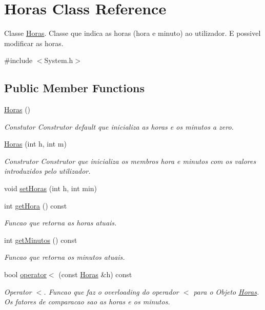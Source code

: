 \hypertarget{class_horas}{}\section{Horas Class Reference}
\label{class_horas}


Classe \hyperlink{class_horas}{Horas}. Classe que indica as horas (hora e minuto) ao utilizador. E possivel modificar as horas.  




{\ttfamily \#include $<$System.\+h$>$}

\subsection*{Public Member Functions}
\begin{DoxyCompactItemize}
\item 
\hypertarget{class_horas_aeef70cbde1c7253dfbb2135fbadc483b}{}\hyperlink{class_horas_aeef70cbde1c7253dfbb2135fbadc483b}{Horas} ()\label{class_horas_aeef70cbde1c7253dfbb2135fbadc483b}

\begin{DoxyCompactList}\small\item\em Constutor Construtor default que inicializa as horas e os minutos a zero. \end{DoxyCompactList}\item 
\hypertarget{class_horas_abbbba3d917352ba3350cafe29753c60f}{}\hyperlink{class_horas_abbbba3d917352ba3350cafe29753c60f}{Horas} (int h, int m)\label{class_horas_abbbba3d917352ba3350cafe29753c60f}

\begin{DoxyCompactList}\small\item\em Construtor Construtor que inicializa os membros hora e minutos com os valores introduzidos pelo utilizador. \end{DoxyCompactList}\item 
void \hyperlink{class_horas_a5da58fcd1a263e3c97e6e11c35b61d76}{set\+Horas} (int h, int min)
\item 
int \hyperlink{class_horas_af72b7e4e7206236f8dc9a4d4b68eff0c}{get\+Hora} () const 
\begin{DoxyCompactList}\small\item\em Funcao que retorna as horas atuais. \end{DoxyCompactList}\item 
int \hyperlink{class_horas_a51e1dd7ac2811960ac1c2faacd034a3c}{get\+Minutos} () const 
\begin{DoxyCompactList}\small\item\em Funcao que retorna os minutos atuais. \end{DoxyCompactList}\item 
bool \hyperlink{class_horas_a3e491978c400b71edf4cb3cff6b81877}{operator$<$} (const \hyperlink{class_horas}{Horas} \&h) const 
\begin{DoxyCompactList}\small\item\em Operator $<$. Funcao que faz o overloading do operador $<$ para o Objeto \hyperlink{class_horas}{Horas}. Os fatores de comparacao sao as horas e os minutos. \end{DoxyCompactList}\end{DoxyCompactItemize}
